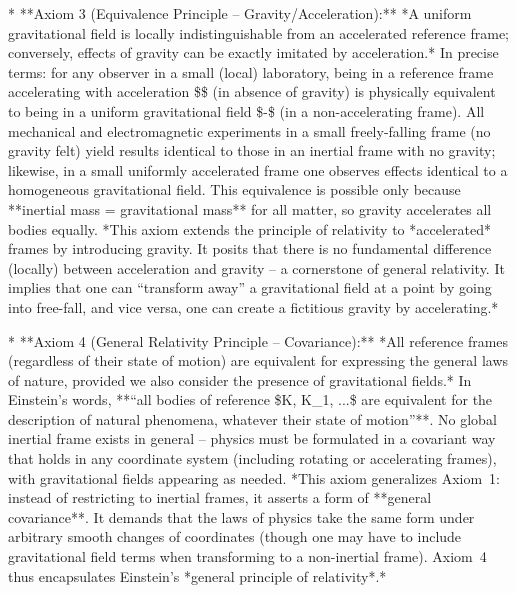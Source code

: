 \documentclass{article}
\begin{document}
* **Axiom 3 (Equivalence Principle – Gravity/Acceleration):** *A uniform gravitational field is locally indistinguishable from an accelerated reference frame; conversely, effects of gravity can be exactly imitated by acceleration.* In precise terms: for any observer in a small (local) laboratory, being in a reference frame accelerating with acceleration \$\$ (in absence of gravity) is physically equivalent to being in a uniform gravitational field \$-\$ (in a non-accelerating frame). All mechanical and electromagnetic experiments in a small freely-falling frame (no gravity felt) yield results identical to those in an inertial frame with no gravity; likewise, in a small uniformly accelerated frame one observes effects identical to a homogeneous gravitational field. This equivalence is possible only because **inertial mass = gravitational mass** for all matter, so gravity accelerates all bodies equally. *This axiom extends the principle of relativity to *accelerated* frames by introducing gravity. It posits that there is no fundamental difference (locally) between acceleration and gravity – a cornerstone of general relativity. It implies that one can “transform away” a gravitational field at a point by going into free-fall, and vice versa, one can create a fictitious gravity by accelerating.*

* **Axiom 4 (General Relativity Principle – Covariance):** *All reference frames (regardless of their state of motion) are equivalent for expressing the general laws of nature, provided we also consider the presence of gravitational fields.* In Einstein’s words, **“all bodies of reference \$K, K\_1, ...\$ are equivalent for the description of natural phenomena, whatever their state of motion”**. No global inertial frame exists in general – physics must be formulated in a covariant way that holds in any coordinate system (including rotating or accelerating frames), with gravitational fields appearing as needed. *This axiom generalizes Axiom 1: instead of restricting to inertial frames, it asserts a form of **general covariance**. It demands that the laws of physics take the same form under arbitrary smooth changes of coordinates (though one may have to include gravitational field terms when transforming to a non-inertial frame). Axiom 4 thus encapsulates Einstein’s *general principle of relativity*.*
\end{document}
